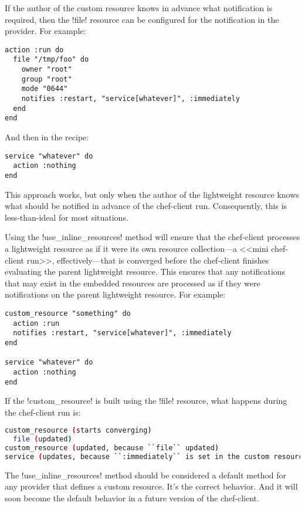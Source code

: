 If the author of the custom resource knows in advance what notification is required, then the \inline!file! resource can be configured for the notification in the provider. For example:

\begin{lstlisting}[label=lst:cookbook-lwrp-inline-resources3]
action :run do
  file "/tmp/foo" do
    owner "root"
    group "root"
    mode "0644"
    notifies :restart, "service[whatever]", :immediately
  end
end
\end{lstlisting}

And then in the recipe:

\begin{lstlisting}[label=lst:cookbook-lwrp-inline-resources4]
service "whatever" do
  action :nothing
end
\end{lstlisting}

This approach works, but only when the author of the lightweight resource knows what should be notified in advance of the chef-client run. Consequently, this is less-than-ideal for most situations.

Using the \inline!use_inline_resources! method will ensure that the chef-client processes a lightweight resource as if it were its own resource collection—a <<mini chef-client run>>, effectively—that is converged before the chef-client finishes evaluating the parent lightweight resource. This ensures that any notifications that may exist in the embedded resources are processed as if they were notifications on the parent lightweight resource. For example:

\begin{lstlisting}[label=lst:cookbook-lwrp-inline-resources5]
custom_resource "something" do
  action :run
  notifies :restart, "service[whatever]", :immediately
end

service "whatever" do
  action :nothing
end
\end{lstlisting}

If the \inline!custom_resource! is built using the \inline!file! resource, what happens during the chef-client run is:

\begin{lstlisting}[language=Bash,label=lst:cookbook-lwrp-inline-resources6]
custom_resource (starts converging)
  file (updated)
custom_resource (updated, because ``file`` updated)
service (updates, because ``:immediately`` is set in the custom resource)
\end{lstlisting}

The \inline!use_inline_resources! method should be considered a default method for any provider that defines a custom resource. It's the correct behavior. And it will soon become the default behavior in a future version of the chef-client.

